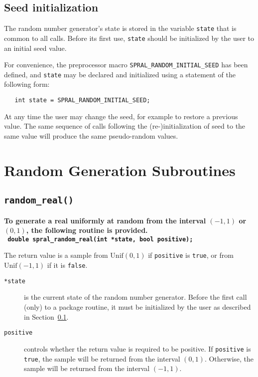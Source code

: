 \subsection{Seed initialization}
\label{random: seed initialization}
The random number generator's state is stored in the variable {\tt state} that
is common to all calls. Before its first use, {\tt state} should be initialized
by the user to an initial seed value.

For convenience, the preprocessor macro \texttt{SPRAL\_RANDOM\_INITIAL\_SEED}
has been defined, and \texttt{state} may be declared and initialized using a
statement of the following form:
\begin{verbatim}
   int state = SPRAL_RANDOM_INITIAL_SEED;
\end{verbatim}

At any time the user may change the seed, for example to restore a previous
value. The same sequence of calls following the (re-)initialization of seed to
the same value will produce the same pseudo-random values.


\section{Random Generation Subroutines}


\subsection{\texttt{random\_real()}}

\textbf{\noindent
   To generate a real uniformly at random from the interval $(-1,1)$ or $(0,1)$, the following routine is provided.
   \vspace*{0.1cm} \\
   \texttt{ \hspace*{0.2cm}
      double spral\_random\_real(int *state, bool positive);
   }
   \vspace{0.3cm}
}

\noindent
The return value is a sample from $\mathrm{Unif}(0,1)$ if {\tt positive} is
{\tt true}, or from $\mathrm{Unif}(-1,1)$ if it is {\tt false}.

\begin{description}

\item[\texttt{*state}] is the current state of the random number generator.
   Before the first call (only) to a package routine, it must be initialized by
   the user as described in Section~\ref{random: seed initialization}.

\item[\texttt{positive}] controls whether the return value is required to be
   positive. If \texttt{positive} is \texttt{true}, the sample will be returned
   from the interval $(0,1)$. Otherwise, the sample will be returned from the
   interval $(-1,1)$.

\end{description}

